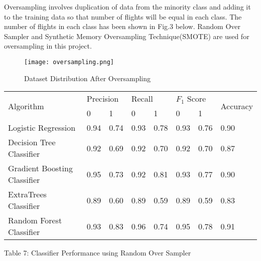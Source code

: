 \documentclass[12pt,letter-paper]{article}
\begin{document}
    Oversampling involves duplication of data from the minority class and adding it to the training data so that number of flights will be equal in each class. The number of flights in each class has been shown in Fig.3 below. Random Over Sampler and Synthetic Memory Oversampling Technique(SMOTE) are used for oversampling in this project.
        
            \begin{figure}[H]%
                \begin{center}
                    \texttt{[image: oversampling.png]}%
                        \caption{Dataset Distribution After Oversampling}  
                \end{center}
            \end{figure}
            
            \begin{table}[H]
        \begin{center}
            \begin{tabular}{|l|l|l|l|l|l|l|l|}
                \hline
                \multirow{2}{*}{Algorithm} & \multicolumn{2}{l|}{Precision} & \multicolumn{2}{l|}{Recall} & \multicolumn{2}{l|}{$F_1$ Score} & \multirow{2}{*}{Accuracy} \\ \cline{2-7}
                                   & 0              & 1             & 0            & 1            & 0             & 1             &                           \\ \hline
            Logistic Regression         & 0.94           & 0.74          & 0.93         & 0.78         & 0.93          & 0.76          & 0.90                     \\ \hline
            Decision Tree Classifier         & 0.92           & 0.69          & 0.92         & 0.70         & 0.92          & 0.70          & 0.87                      \\ \hline
            Gradient Boosting Classifier & 0.95           & 0.73          & 0.92         & 0.81         & 0.93          & 0.77          & 0.90                      \\ \hline
            ExtraTrees Classifier       & 0.89           & 0.60          & 0.89         & 0.59         & 0.89          & 0.59          & 0.83                      \\ \hline
            Random Forest Classifier     & 0.93           & 0.83          & 0.96         & 0.74         & 0.95          & 0.78          & 0.91                      \\ \hline
            \end{tabular}
        \end{center}
        \begin{center}
        Table 7: Classifier Performance using Random Over Sampler
            \end{center}
        \end{table}
        
\end{document}
